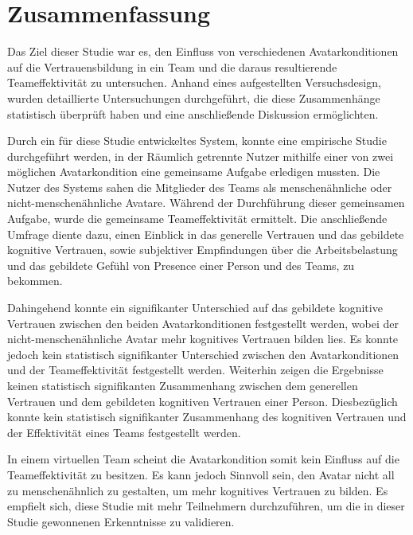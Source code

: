 \documentclass[a4paper,11pt]{article}%
\renewcommand{\\}{\vspace*{0.5\baselineskip} \newline}
\begin{document}
\section{Zusammenfassung}
Das Ziel dieser Studie war es, den Einfluss von verschiedenen Avatarkonditionen auf die Vertrauensbildung in ein Team und die daraus resultierende Teameffektivität zu untersuchen. 
Anhand eines aufgestellten Versuchsdesign, wurden detaillierte Untersuchungen durchgeführt, die diese Zusammenhänge statistisch überprüft haben und eine anschließende Diskussion ermöglichten.

Durch ein für diese Studie entwickeltes System, konnte eine empirische Studie durchgeführt werden, in der Räumlich getrennte Nutzer mithilfe einer von zwei möglichen Avatarkondition eine gemeinsame Aufgabe erledigen mussten. Die Nutzer des Systems sahen die Mitglieder des Teams als menschenähnliche oder nicht-menschenähnliche Avatare. Während der Durchführung dieser gemeinsamen Aufgabe, wurde die gemeinsame Teameffektivität ermittelt. Die anschließende Umfrage diente dazu, einen Einblick in das generelle Vertrauen und das gebildete kognitive Vertrauen, sowie subjektiver Empfindungen über die Arbeitsbelastung und das gebildete Gefühl von Presence einer Person und des Teams, zu bekommen.

Dahingehend konnte ein signifikanter Unterschied auf das gebildete kognitive Vertrauen zwischen den beiden Avatarkonditionen festgestellt werden, wobei der nicht-menschenähnliche Avatar mehr kognitives Vertrauen bilden lies.
Es konnte jedoch kein statistisch signifikanter Unterschied zwischen den Avatarkonditionen und der Teameffektivität festgestellt werden. Weiterhin zeigen die Ergebnisse keinen statistisch signifikanten Zusammenhang zwischen dem generellen Vertrauen und dem gebildeten kognitiven Vertrauen einer Person. Diesbezüglich konnte kein statistisch signifikanter Zusammenhang des kognitiven Vertrauen und der Effektivität eines Teams festgestellt werden.

In einem virtuellen Team scheint die Avatarkondition somit kein Einfluss auf die Teameffektivität zu besitzen. Es kann jedoch Sinnvoll sein, den Avatar nicht all zu menschenähnlich zu gestalten, um mehr kognitives Vertrauen zu bilden.
Es empfielt sich, diese Studie mit mehr Teilnehmern durchzuführen, um die in dieser Studie gewonnenen Erkenntnisse zu validieren.

%
%
\newpage
\end{document}
